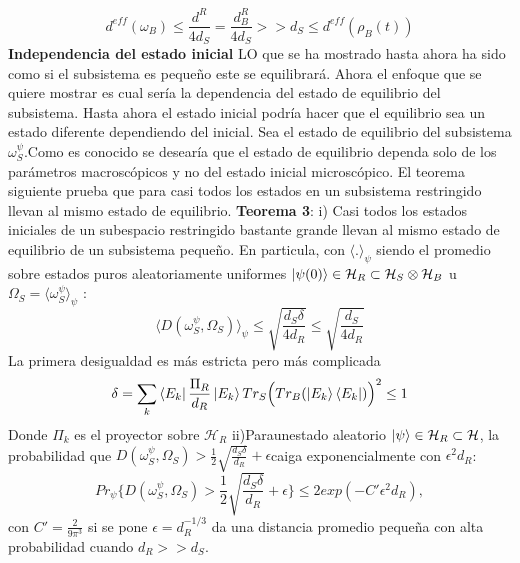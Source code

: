 \begin{equation}
d^{eff}(\omega_{B}) \leq \frac{d^{R}}{4d_{S}}=\frac{d_{B}^{R}}{4d_{S}} >>d_{S} \leq d^{eff}(\rho_{B}(t))
\end{equation}
\textbf{Independencia del estado inicial}
LO que se ha mostrado hasta ahora ha sido como si el subsistema es pequeño este se equilibrará. Ahora el enfoque que se quiere mostrar es cual sería la dependencia del estado de equilibrio del subsistema. Hasta ahora el estado inicial podría hacer que el equilibrio sea un estado diferente dependiendo del inicial. Sea el estado de equilibrio del subsistema $\omega_{S}^{\psi}$.Como es conocido se desearía que el estado de equilibrio dependa solo de los parámetros macroscópicos y no del estado inicial microscópico.
El teorema siguiente prueba que para casi todos los estados en un subsistema restringido llevan al mismo estado de equilibrio.
\textbf{Teorema 3}:
i) Casi todos los estados iniciales de un subespacio restringido bastante grande llevan al mismo estado de equilibrio de un subsistema pequeño. En particula, con $\langle .\rangle_{\psi}$ siendo el promedio sobre estados puros aleatoriamente uniformes $\ket{\psi(0)} \in \mathcal{H}_{R} \subset \mathcal{H}_{S} \otimes \mathcal{H}_{B}$ u $\Omega_{S}= \langle \omega_{S}^{\psi} \rangle_{\psi}$ :
\begin{equation}
\langle D(\omega_{S}^{\psi}, \Omega_{S}) \rangle_{\psi} \leq \sqrt{\frac{d_{S} \delta}{4d_{R}}} \leq \sqrt{\frac{d_{S}}{4d_{R}}}
\end{equation}
La primera desigualdad es más estricta pero más complicada 
\begin{equation}
\delta= \sum_{k}\bra{E_{k}}\frac{\Pi_{R}}{d_{R}}\ket{E_{k}} Tr_{S} \Big( Tr_{B} (\ket{E_{k}} \bra{E_{k}}) \Big)^{2} \leq  1
\end{equation}
Donde $\Pi_{k}$ es el proyector sobre $\mathcal{H}_{R}$
ii)Paraunestado aleatorio $\ket{\psi} \in \mathcal{H}_{R}\subset \mathcal{H}$, la probabilidad que $D(\omega_{S}^{\psi},\Omega_{S}) > \frac{1}{2} \sqrt{\frac{d_{S} \delta}{d_{R}}}+ \epsilon$caiga exponencialmente con $\epsilon^{2}d_{R}$:
\begin{equation}
Pr_{\psi} \{ D(\omega_{S}^{\psi}, \Omega_{S}) > \frac{1}{2}\sqrt{\frac{d_{S} \delta}{d_{R}}} + \epsilon \} \leq 2exp(-C'\epsilon^{2}d_{R}),
\end{equation}
con $C'=\frac{2}{9 \pi^{3}}$ si se pone $\epsilon=d_{R}^{-1/3}$ da una distancia promedio pequeña con alta probabilidad cuando $d_{R}>>d_{S}$.

